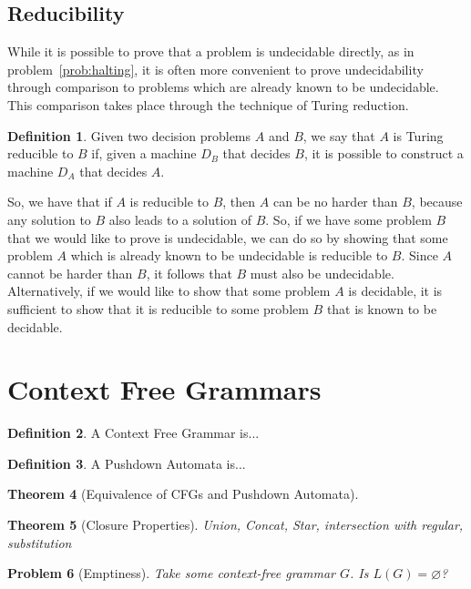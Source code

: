 \documentclass[psamsfonts]{amsart}
\newtheorem{thm}{Theorem}[section]
\newtheorem{prob}[thm]{Problem}
\theoremstyle{definition}
\newtheorem{defn}[thm]{Definition}
\theoremstyle{remark}
\numberwithin{equation}{section}
\begin{document}
\subsection{Reducibility}
While it is possible to prove that a problem is undecidable directly, as in
problem~\ref{prob:halting}, it is often more convenient to prove undecidability
through comparison to problems which are already known to be undecidable. This
comparison takes place through the technique of Turing reduction.
\begin{defn}
  Given two decision problems $A$ and $B$, we say that $A$ is Turing reducible
  to $B$ if, given a machine $D_B$ that decides $B$, it is possible to construct
  a machine $D_A$ that decides $A$.
\end{defn}
So, we have that if $A$ is reducible to $B$, then $A$ can be no harder than $B$,
because any solution to $B$ also leads to a solution of $B$. So, if we have some
problem $B$ that we would like to prove is undecidable, we can do so by showing
that some problem $A$ which is already known to be undecidable is reducible to
$B$. Since $A$ cannot be harder than $B$, it follows that $B$ must also be
undecidable. Alternatively, if we would like to show that some problem $A$ is
decidable, it is sufficient to show that it is reducible to some problem $B$
that is known to be decidable.
\cite{sipser13:_introd_theor_comput}
\cite{post44:_recur}

\cite{kleene80_introd}

\section{Context Free Grammars}

\begin{defn}
 A Context Free Grammar is...
\end{defn}

\begin{defn}
  A Pushdown Automata is...
\end{defn}

\begin{thm}[Equivalence of CFGs and Pushdown Automata]
  \cite{hopcroft07:_introd_autom_theor_languag_comput}
\end{thm}
\begin{thm}[Closure Properties]
  \cite{sipser13:_introd_theor_comput}
  Union, Concat, Star, intersection with regular, substitution
\end{thm}
\begin{prob}[Emptiness]
  \label{prob:cfg:emptiness}
Take some context-free grammar $G$. Is $L(G)=\varnothing$?
\end{prob}
\end{document}
